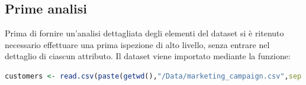 \documentclass[letterpaper,11pt]{article}
\begin{document}
\subsection{Prime analisi}
Prima di fornire un'analisi dettagliata degli elementi del dataset si è ritenuto necessario effettuare una prima ispezione di alto livello, senza entrare nel dettaglio di ciascun attributo. Il dataset viene importato mediante la funzione:
\begin{lstlisting}[language=R]
customers <- read.csv(paste(getwd(),"/Data/marketing_campaign.csv",sep = ""), header=TRUE, sep="\t",  stringsAsFactors=F) # use TAB as separator!
\end{lstlisting}
\begin{figure}[H]
     \begin{center}
%
        \\ %
%
    \end{center}
\end{figure}
\end{document}
